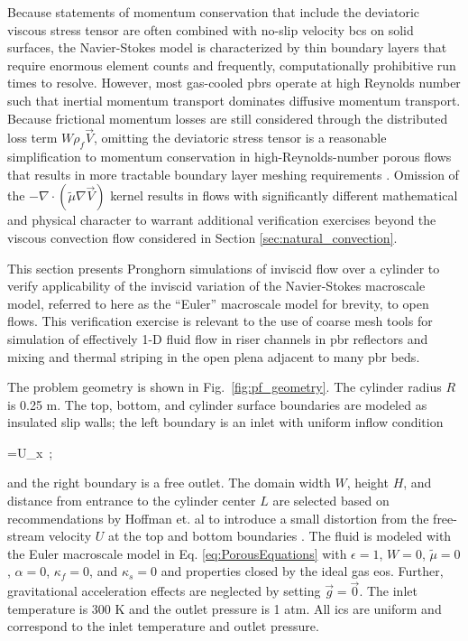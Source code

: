 Because statements of momentum conservation that include the deviatoric viscous stress tensor are often combined with no-slip velocity \glspl{bc} on solid surfaces, the Navier-Stokes model is characterized by thin boundary layers that require enormous element counts and frequently, computationally prohibitive run times to resolve. However, most gas-cooled \glspl{pbr} operate at high Reynolds number such that inertial momentum transport dominates diffusive momentum transport. Because frictional momentum losses are still considered through the distributed loss term \(W\rho_f\vec{V}\), omitting the deviatoric stress tensor is a reasonable simplification to momentum conservation in high-Reynolds-number porous flows that results in more tractable boundary layer meshing requirements \cite{kececioglu}. Omission of the \(-\nabla\cdot(\tilde{\mu}\nabla\vec{V})\) kernel results in flows with significantly different mathematical and physical character to warrant additional verification exercises beyond the viscous convection flow considered in Section \ref{sec:natural_convection}.

This section presents Pronghorn simulations of inviscid flow over a cylinder to verify applicability of the inviscid variation of the Navier-Stokes macroscale model, referred to here as the ``Euler'' macroscale model for brevity, to open flows. This verification exercise is relevant to the use of coarse mesh tools for simulation of effectively 1-D fluid flow in riser channels in \gls{pbr} reflectors and mixing and thermal striping in the open plena adjacent to many \gls{pbr} beds. 

The problem geometry is shown in Fig.\ \ref{fig:pf_geometry}. The cylinder radius \(R\) is 0.25 \si{\meter}. The top, bottom, and cylinder surface boundaries are modeled as insulated slip walls; the left boundary is an inlet with uniform inflow condition

\beq
\label{eq:FreeStreamV}
=U_x\ ;
\eeq

\noindent and the right boundary is a free outlet. The domain width \(W\), height \(H\), and distance from entrance to the cylinder center \(L\) are selected based on recommendations by Hoffman et. al to introduce a small distortion from the free-stream velocity \(U\) at the top and bottom boundaries \cite{hoffman_2011}. The fluid is modeled with the Euler macroscale model in Eq. \eqref{eq:PorousEquations} with \(\epsilon=1\), \(W=0\), \(\tilde{\mu}=0\), \(\alpha=0\), \(\kappa_f=0\), and \(\kappa_s=0\) and properties closed by the ideal gas \gls{eos}. Further, gravitational acceleration effects are neglected by setting \(\vec{g}=\vec{0}\). The inlet temperature is 300 \si{\kelvin} and the outlet pressure is 1 atm. All \glspl{ic} are uniform and correspond to the inlet temperature and outlet pressure.

